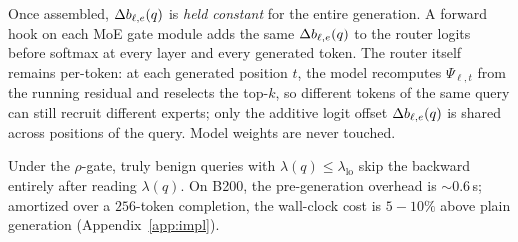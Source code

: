 Once assembled, $\Delta b_{\ell,e}(q)$ is \emph{held constant} for the entire generation. A forward hook on each MoE gate module adds the same $\Delta b_{\ell,e}(q)$ to the router logits before softmax at every layer and every generated token. The router itself remains per-token: at each generated position $t$, the model recomputes $\Psi_{\ell,t}$ from the running residual and reselects the top-$k$, so different tokens of the same query can still recruit different experts; only the additive logit offset $\Delta b_{\ell,e}(q)$ is shared across positions of the query. Model weights are never touched.

Under the $\rho$-gate, truly benign queries with $\lambda(q) \le \lambda_{\text{lo}}$ skip the backward entirely after reading $\lambda(q)$. On B200, the pre-generation overhead is $\sim 0.6$\,s; amortized over a $256$-token completion, the wall-clock cost is $5{-}10\%$ above plain generation (Appendix~\ref{app:impl}).

